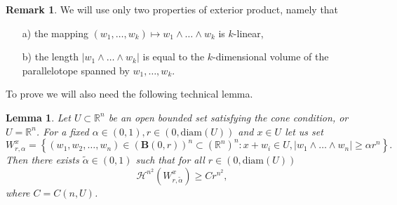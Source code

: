 \documentclass[11pt]{amsart}
\newcommand{\R}{\mathbb{R}}
\renewcommand{\H}{\mathscr{H}}
\newcommand{\diam}{\mathrm{diam}}
\newtheorem{lemma}[theorem]{Lemma}
\theoremstyle{definition}
\newtheorem{remark}[theorem]{Remark}
\begin{document}
	\begin{remark}
		We will use only two properties of exterior product, namely that
		\begin{itemize}
			\item[a)] the mapping $(w_1,\dots, w_k)\mapsto w_1\wedge\dots\wedge w_k$ is $k$-linear,
			\item[b)] the length $|w_1\wedge\dots\wedge w_k|$ is equal to the $k$-dimensional volume of the parallelotope spanned by $w_1,\dots,w_k$.
		\end{itemize}
	\end{remark}
	To prove  we will also need the following technical lemma.
	
	\begin{lemma}\label{lem:alpha_tilde}
		Let $ U\subset\R^n$ be an open bounded set satisfying the cone condition, or $U=\R^n$. For a fixed $\alpha\in (0,1), r\in(0,\diam( U))$ and $x\in U$ let us set
		\[
		W_{r,\alpha}^x = \left\{(w_1,w_2,\dots,w_{n})\in(\textbf{B}(0,r))^n\subset (\R^n)^n : x+w_i\in U, |w_1\wedge\dots\wedge w_n|\geq \alpha r^n\right\}.
		\]
		Then there exists $\tilde{\alpha}\in(0,1)$ such that for all $r\in(0,\diam( U))$
		\[\H^{n^2}(W^x_{r,\tilde{\alpha}}) \ge Cr^{n^2},
		\]
		where $C=C(n,U)$.		
	\end{lemma}
	
\end{document}
